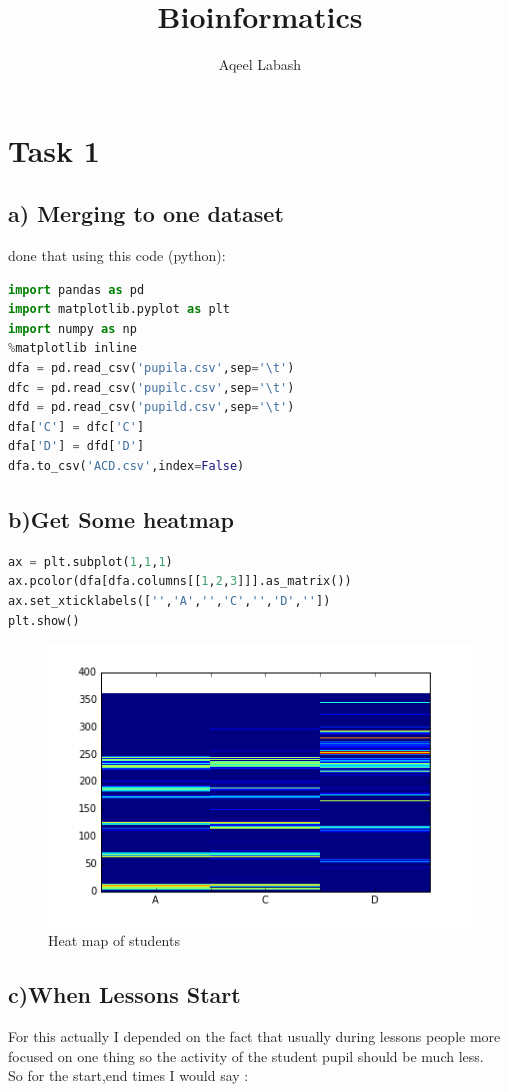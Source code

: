 \documentclass[10pt]{article}
\date{\vspace{-11.5ex}}
\author{\vspace{-10ex}}
\author{Aqeel Labash}
\title{Bioinformatics}
\begin{document}
\maketitle
\section*{Task 1}
\subsection*{a) Merging to one dataset}
done that using this code (python): 
\begin{lstlisting}[language=python]
import pandas as pd
import matplotlib.pyplot as plt
import numpy as np
%matplotlib inline
dfa = pd.read_csv('pupila.csv',sep='\t')
dfc = pd.read_csv('pupilc.csv',sep='\t')
dfd = pd.read_csv('pupild.csv',sep='\t')
dfa['C'] = dfc['C']
dfa['D'] = dfd['D']
dfa.to_csv('ACD.csv',index=False)
\end{lstlisting}
\subsection*{b)Get Some heatmap}
\begin{lstlisting}[language=python]
ax = plt.subplot(1,1,1)
ax.pcolor(dfa[dfa.columns[[1,2,3]]].as_matrix())
ax.set_xticklabels(['','A','','C','','D',''])
plt.show()
\end{lstlisting}
\begin{figure}[H]
\includegraphics[scale=1]{heatmap.png}
\caption{Heat map of students}
\end{figure}
\subsection*{c)When Lessons Start}
For this actually I depended on the fact that usually during lessons people more focused on one thing so the activity of the student pupil should be much less.\\
So for the start,end times I would say : \\
\end{document}
